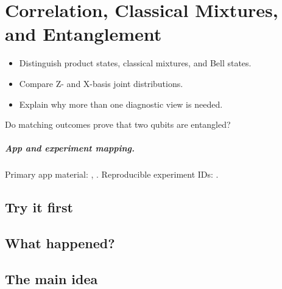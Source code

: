 \chapter[Correlation and Entanglement]{Correlation, Classical Mixtures, and Entanglement}
\label{chap:correlation-classical-mixtures-and-entanglement}

\begin{learningobjectives}
\begin{itemize}
  \item Distinguish product states, classical mixtures, and Bell states.
  \item Compare Z- and X-basis joint distributions.
  \item Explain why more than one diagnostic view is needed.
\end{itemize}
\end{learningobjectives}

\begin{openingquestion}
Do matching outcomes prove that two qubits are entangled?
\end{openingquestion}

\paragraph{App and experiment mapping.}
Primary app material: , . Reproducible experiment IDs:
.

\section{Try it first}
\begin{tryit}
\end{tryit}

\section{What happened?}

\section{The main idea}
\begin{coreidea}
\end{coreidea}

